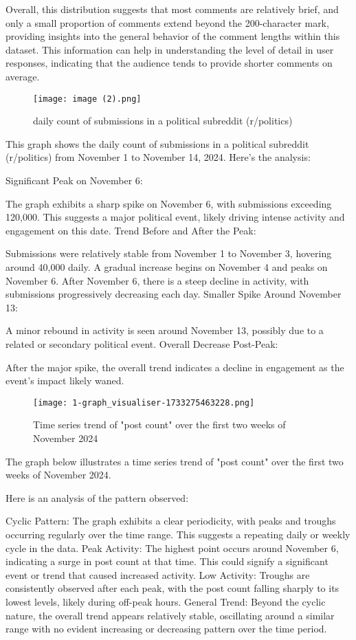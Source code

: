 \documentclass[sigconf]{acmart}
\begin{document}
Overall, this distribution suggests that most comments are relatively brief, and only a small proportion of comments extend beyond the 200-character mark, providing insights into the general behavior of the comment lengths within this dataset. This information can help in understanding the level of detail in user responses, indicating that the audience tends to provide shorter comments on average.



\begin{figure}[h]
    \texttt{[image: image (2).png]}
    \caption{daily count of submissions in a political subreddit (r/politics)}
    \label{fig:daily_submissions}
    \end{figure}
    This graph shows the daily count of submissions in a political subreddit (r/politics) from November 1 to November 14, 2024. Here’s the analysis:

Significant Peak on November 6:

The graph exhibits a sharp spike on November 6, with submissions exceeding 120,000. This suggests a major political event, likely driving intense activity and engagement on this date.
Trend Before and After the Peak:

Submissions were relatively stable from November 1 to November 3, hovering around 40,000 daily.
A gradual increase begins on November 4 and peaks on November 6.
After November 6, there is a steep decline in activity, with submissions progressively decreasing each day.
Smaller Spike Around November 13:

A minor rebound in activity is seen around November 13, possibly due to a related or secondary political event.
Overall Decrease Post-Peak:

After the major spike, the overall trend indicates a decline in engagement as the event's impact likely waned.




\begin{figure}[h]
    \texttt{[image: 1-graph\_visualiser-1733275463228.png]}
    \caption{Time series trend of "post count" over the first two weeks of November 2024}
    \label{fig:toxicity_distribution}
    \end{figure}
    The graph below illustrates a time series trend of "post count" over the first two weeks of November 2024. 
    
    Here is an analysis of the pattern observed: 
    
    Cyclic Pattern: The graph exhibits a clear periodicity, with peaks and troughs occurring regularly over the time range. This suggests a repeating daily or weekly cycle in the data. Peak Activity: The highest point occurs around November 6, indicating a surge in post count at that time. This could signify a significant event or trend that caused increased activity. Low Activity: Troughs are consistently observed after each peak, with the post count falling sharply to its lowest levels, likely during off-peak hours. General Trend: Beyond the cyclic nature, the overall trend appears relatively stable, oscillating around a similar range with no evident increasing or decreasing pattern over the time period.
\end{document}
